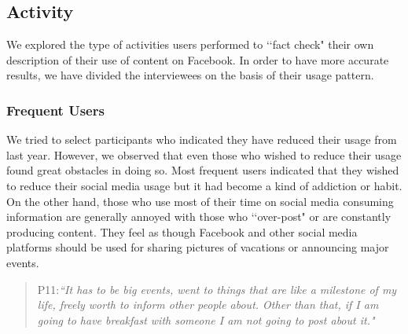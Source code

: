 \subsection{Activity}
We explored the type of activities users performed to \lq \lq fact check" their own description of their use of content on Facebook. In order to have more accurate results, we have divided the interviewees on the basis of their usage pattern.

\subsubsection{Frequent Users}
We tried to select participants who indicated they have reduced their usage from last year. However, we observed that even those who wished to reduce their usage found great obstacles in doing so. Most frequent users indicated that they wished to reduce their social media usage but it had become a kind of addiction or habit. On the other hand, those who use most of their time on social media consuming information are generally annoyed with those who \lq \lq over-post" or are constantly producing content. They feel as though Facebook and other social media platforms should be used for sharing pictures of vacations or announcing major events.
\begin{quote}
P11:\textit{``It has to be big events, went to things that are like a milestone of my life, freely worth to inform other people about. Other than that, if I am going to have breakfast with someone I am not going to post about it."}
\end{quote}

